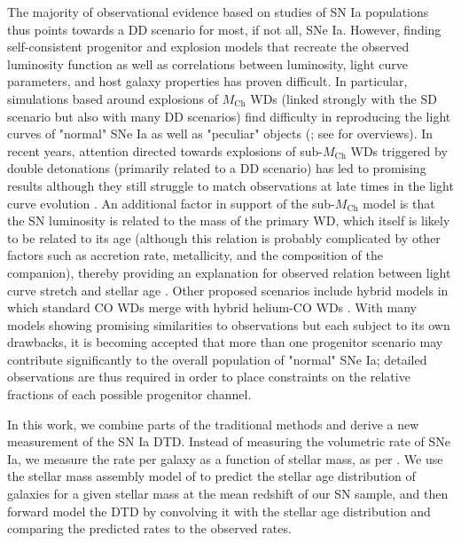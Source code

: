 \documentclass[fleqn,usenatbib]{mnras}
\begin{document}
The majority of observational evidence based on studies of SN Ia populations thus points towards a DD scenario for most, if not all, SNe Ia. However, finding self-consistent progenitor and explosion models that recreate the observed luminosity function as well as correlations between luminosity, light curve parameters, and host galaxy properties has proven difficult. In particular, simulations based around explosions of $M_{\mathrm{Ch}}$ WDs (linked strongly with the SD scenario but also with many DD scenarios) find difficulty in reproducing the light curves of "normal" SNe Ia as well as "peculiar" objects (\citealt{Ropke2007,Sim2013,Blondin2017}; see \citealt{Maoz2014,Jha2019} for overviews). In recent years, attention directed towards explosions of sub-$M_{\mathrm{Ch}}$ WDs triggered by double detonations (primarily related to a DD scenario) has led to promising results \citep[e.g.][]{Shen2017,Shen2018,Townsley2019,Gronow2020,Shen2021} although they still struggle to match observations at late times in the light curve evolution \citep{Shen2021,Gronow2021}. An additional factor in support of the sub-$M_{\mathrm{Ch}}$ model is that the SN luminosity is related to the mass of the primary WD, which itself is likely to be related to its age (although this relation is probably complicated by other factors such as accretion rate, metallicity, and the composition of the companion), thereby providing an explanation for observed relation between light curve stretch and stellar age \citep{Rigault2013,Rigault2018,Rose2019,Nicolas2020}. Other proposed scenarios include hybrid models in which standard CO WDs merge with hybrid helium-CO WDs \citep{Zenati2019}. With many models showing promising similarities to observations but each subject to its own drawbacks, it is becoming accepted that more than one progenitor scenario may contribute significantly to the overall population of "normal" SNe Ia; detailed observations are thus required in order to place constraints on the relative fractions of each possible progenitor channel. 

In this work, we combine parts of the traditional methods and derive a new measurement of the SN Ia DTD. Instead of measuring the volumetric rate of SNe Ia, we measure the rate per galaxy as a function of stellar mass, as per \citet{Sullivan2006,Smith2012,Brown2019}. We use the stellar mass assembly model of  to predict the stellar age distribution of galaxies for a given stellar mass at the mean redshift of our SN sample, and then forward model the DTD by convolving it with the stellar age distribution and comparing the predicted rates to the observed rates.
\end{document}
